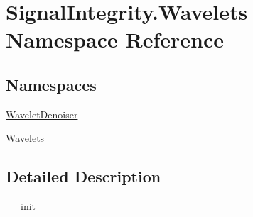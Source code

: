 \hypertarget{namespaceSignalIntegrity_1_1Wavelets}{}\section{Signal\+Integrity.\+Wavelets Namespace Reference}
\label{namespaceSignalIntegrity_1_1Wavelets}
\subsection*{Namespaces}
\begin{DoxyCompactItemize}
\item 
 \hyperlink{namespaceSignalIntegrity_1_1Wavelets_1_1WaveletDenoiser}{Wavelet\+Denoiser}
\item 
 \hyperlink{namespaceSignalIntegrity_1_1Wavelets_1_1Wavelets}{Wavelets}
\end{DoxyCompactItemize}


\subsection{Detailed Description}
\begin{DoxyVerb}__init__\end{DoxyVerb}
 